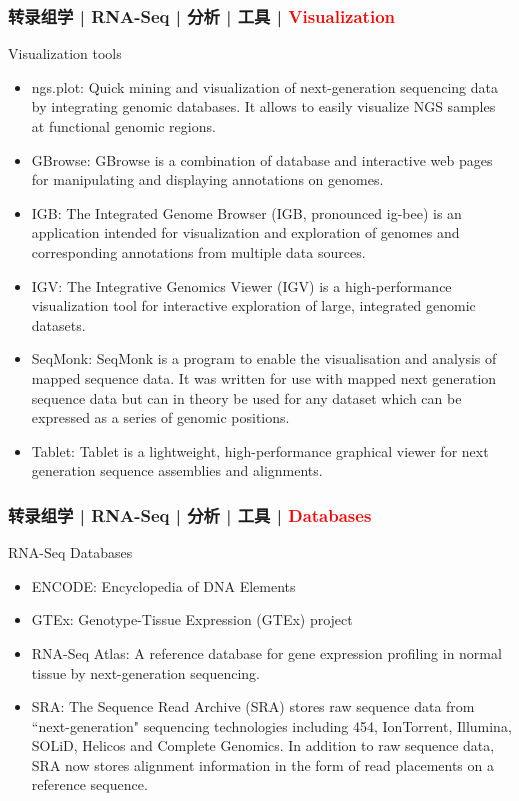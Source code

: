 \begin{frame}
  \frametitle{转录组学 | RNA-Seq | 分析 | 工具 | \textcolor{red}{Visualization}}
  {\footnotesize
  \begin{block}{Visualization tools}
    \begin{itemize}
      \item ngs.plot: Quick mining and visualization of next-generation sequencing data by integrating genomic databases. It allows to easily visualize NGS samples at functional genomic regions.
      \item GBrowse: GBrowse is a combination of database and interactive web pages for manipulating and displaying annotations on genomes.
      \item IGB: The Integrated Genome Browser (IGB, pronounced ig-bee) is an application intended for visualization and exploration of genomes and corresponding annotations from multiple data sources.
      \item IGV: The Integrative Genomics Viewer (IGV) is a high-performance visualization tool for interactive exploration of large, integrated genomic datasets.
      \item SeqMonk: SeqMonk is a program to enable the visualisation and analysis of mapped sequence data. It was written for use with mapped next generation sequence data but can in theory be used for any dataset which can be expressed as a series of genomic positions.
      \item Tablet: Tablet is a lightweight, high-performance graphical viewer for next generation sequence assemblies and alignments.
    \end{itemize}
  \end{block}
  }
\end{frame}

\begin{frame}
  \frametitle{转录组学 | RNA-Seq | 分析 | 工具 | \textcolor{red}{Databases}}
  \begin{block}{RNA-Seq Databases}
    \begin{itemize}
      \item ENCODE: Encyclopedia of DNA Elements
      \item GTEx: Genotype-Tissue Expression (GTEx) project
      \item RNA-Seq Atlas: A reference database for gene expression profiling in normal tissue by next-generation sequencing.
      \item SRA: The Sequence Read Archive (SRA) stores raw sequence data from ``next-generation" sequencing technologies including 454, IonTorrent, Illumina, SOLiD, Helicos and Complete Genomics. In addition to raw sequence data, SRA now stores alignment information in the form of read placements on a reference sequence.
    \end{itemize}
  \end{block}
\end{frame}


